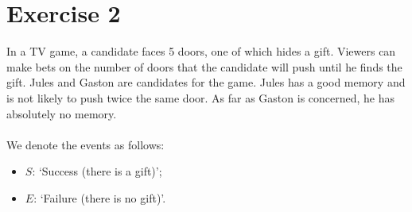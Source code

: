 \documentclass[12pt,thmsa]{article}
\begin{document}
\section*{Exercise 2}

In a TV game, a candidate faces 5 doors, one of which hides a gift. Viewers can make bets on the number of doors that the candidate will push until he finds the gift. Jules and Gaston are candidates for the game. Jules has a good memory and is not likely to push twice the same door. As far as Gaston is concerned, he has absolutely no memory.\\
\\
We denote the events as follows:
\begin{itemize}
\item $S$: `Success (there is a gift)';
\item $E$: `Failure (there is no gift)'.
\end{itemize}
\end{document}
